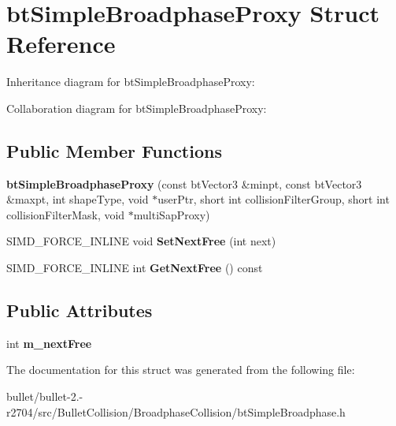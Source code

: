\hypertarget{structbt_simple_broadphase_proxy}{\section{bt\+Simple\+Broadphase\+Proxy Struct Reference}
\label{structbt_simple_broadphase_proxy}
}


Inheritance diagram for bt\+Simple\+Broadphase\+Proxy\+:


Collaboration diagram for bt\+Simple\+Broadphase\+Proxy\+:
\subsection*{Public Member Functions}
\begin{DoxyCompactItemize}
\item 
\hypertarget{structbt_simple_broadphase_proxy_a26f68d0e3cfa37a84e60fb563e0b939b}{{\bfseries bt\+Simple\+Broadphase\+Proxy} (const bt\+Vector3 \&minpt, const bt\+Vector3 \&maxpt, int shape\+Type, void $\ast$user\+Ptr, short int collision\+Filter\+Group, short int collision\+Filter\+Mask, void $\ast$multi\+Sap\+Proxy)}\label{structbt_simple_broadphase_proxy_a26f68d0e3cfa37a84e60fb563e0b939b}

\item 
\hypertarget{structbt_simple_broadphase_proxy_a885804174bd59c9bbceece02810b39f5}{S\+I\+M\+D\+\_\+\+F\+O\+R\+C\+E\+\_\+\+I\+N\+L\+I\+N\+E void {\bfseries Set\+Next\+Free} (int next)}\label{structbt_simple_broadphase_proxy_a885804174bd59c9bbceece02810b39f5}

\item 
\hypertarget{structbt_simple_broadphase_proxy_a763b19e660fd16708e4c5ed9e178fad2}{S\+I\+M\+D\+\_\+\+F\+O\+R\+C\+E\+\_\+\+I\+N\+L\+I\+N\+E int {\bfseries Get\+Next\+Free} () const }\label{structbt_simple_broadphase_proxy_a763b19e660fd16708e4c5ed9e178fad2}

\end{DoxyCompactItemize}
\subsection*{Public Attributes}
\begin{DoxyCompactItemize}
\item 
\hypertarget{structbt_simple_broadphase_proxy_adaa300f989d56303eb8ff0bd29b94474}{int {\bfseries m\+\_\+next\+Free}}\label{structbt_simple_broadphase_proxy_adaa300f989d56303eb8ff0bd29b94474}

\end{DoxyCompactItemize}


The documentation for this struct was generated from the following file\+:\begin{DoxyCompactItemize}
\item 
bullet/bullet-\/2.-\/r2704/src/\+Bullet\+Collision/\+Broadphase\+Collision/bt\+Simple\+Broadphase.\+h\end{DoxyCompactItemize}
